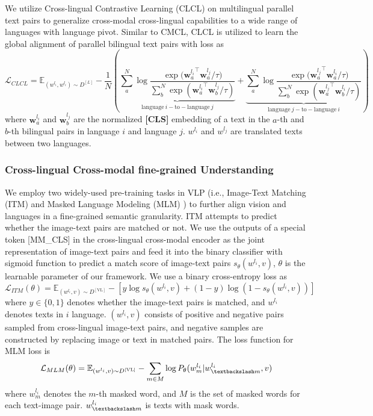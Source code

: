\documentclass{article}
\begin{document}
We utilize Cross-lingual Contrastive Learning (CLCL)  on multilingual parallel text pairs to generalize cross-modal cross-lingual capabilities to a wide range of languages with language pivot. Similar to CMCL, CLCL is utilized to learn the global alignment of parallel bilingual text pairs with loss as
\begin{equation}
\mathcal{L}_{CLCL}=\mathbb{E}_{(w^{l_i},w^{l_i})\sim D^{[L]}}-\frac{1}{N}(\underbrace{ \sum_{a}^{N}\log\frac{{\exp{(\mathbf{w}_{a}^{l_i}}^\top}\mathbf{w}^{l_j}_{a}/\tau)}{\sum_{b}^{N}\exp{({\mathbf{w}_{a}^{l_i}}^{\top}\mathbf{w}^{l_j}_b/\tau)}}}_{\mathrm{language} \ i-\mathrm{to}-\mathrm{language} \ j}+\underbrace{\sum_{a}^{N}\log\frac{{\exp{({\mathbf{w}_{a}^{l_j}}^\top}}\mathbf{w}^{l_i}_{a}/\tau)}{\sum_{b}^{N}\exp{({{\mathbf{w}_a^{l_j}}^\top}\mathbf{w}^{l_i}_b/\tau)}}}_{\mathrm{language} \ j-\mathrm{to}-\mathrm{language} \ i}) 
\end{equation}
where $\mathbf{w}_{a}^{l_i}$ and $\mathbf{w}_{b}^{l_j}$ are the normalized \textbf{[CLS]} embedding of a text in the $a$-th and $b$-th bilingual pairs in language $i$ and language $j$. $w^{l_i}$ and $w^{l_j}$ are translated texts between two languages. 
\subsubsection{Cross-lingual Cross-modal fine-grained Understanding}
We employ two widely-used pre-training tasks in VLP (i.e., Image-Text Matching (ITM) and Masked Language Modeling (MLM) ) to further align vision and languages in a fine-grained semantic granularity. ITM attempts to predict whether the image-text pairs are matched or not. We use the outputs of a special token [MM\_CLS] in the cross-lingual cross-modal encoder as the joint representation of image-text pairs and feed it into the binary classifier with sigmoid function to predict a match score of image-text pairs $s_{\theta}(w^{l_i},v)$, $\theta$ is the learnable parameter of our framework. We use a binary cross-entropy loss as
\begin{equation}
\mathcal{L}_{ITM}(\theta)=\mathbb{E}_{(w^{l_i},v)\sim D^{[\mathrm{VL}]}}-[y\log{s_{\theta}(w^{l_i},v)}+(1-y)\log(1-s_{\theta}(w^{l_i},v))]
\end{equation}
where $y\in \{0,1\}$ denotes whether the image-text pairs is matched, and $w^{l_i}$ denotes texts in $i$ language. $(w^{l_i},v)$ consists of positive and negative pairs sampled from cross-lingual image-text pairs, and negative samples are constructed by replacing image or text in matched pairs. The loss function for MLM loss is 
\begin{equation}
\mathcal{L}_{MLM}(\theta)=\mathbb{E}_{(w^{l_{i}},v)\sim D^{[\mathrm{VL}]}}-\sum_{m \in M}\log{P_{\theta}(w^{l_{i}}_{m}|w^{l_{i}}_{ \textbackslash
 m},v)}
\end{equation}
where $w^{l_i}_{m}$ denotes the $m$-th masked word, and $M$ is the set of masked words for each text-image pair. $w^{l_{i}}_{\textbackslash
m}$ is texts with mask words.
\end{document}

